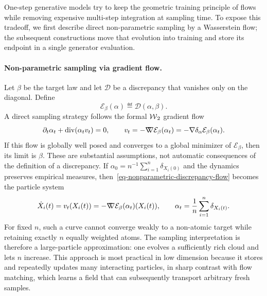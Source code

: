 One-step generative models try to keep the geometric training principle of flows while removing expensive multi-step integration at sampling time. To expose this tradeoff, we first describe direct non-parametric sampling by a Wasserstein flow; the subsequent constructions move that evolution into training and store its endpoint in a single generator evaluation.

\paragraph{Non-parametric sampling via gradient flow.}
Let $\beta$ be the target law and let $\mathcal D$ be a discrepancy that vanishes only on the diagonal. Define
\begin{equation}\label{eq-one-step-discrepancy-energy}
	\mathcal E_\beta(\alpha)\eqdef\mathcal D(\alpha,\beta).
\end{equation}
A direct sampling strategy follows the formal $\operatorname{\mathcal{W}}_2$ gradient flow
\begin{equation}\label{eq-nonparametric-discrepancy-flow}
	\partial_t\alpha_t+\operatorname{div}(\alpha_t v_t)=0,
	\qquad
	v_t=-\mathord{\nabla\mkern-9.3mu\nabla}\mathcal E_\beta(\alpha_t)
	=-\nabla\delta_\alpha\mathcal E_\beta(\alpha_t).
\end{equation}
If this flow is globally well posed and converges to a global minimizer of $\mathcal E_\beta$, then its limit is $\beta$. These are substantial assumptions, not automatic consequences of the definition of a discrepancy. If $\alpha_0=n^{-1}\sum_{i=1}^n\delta_{X_i(0)}$ and the dynamics preserves empirical measures, then~\eqref{eq-nonparametric-discrepancy-flow} becomes the particle system
\begin{equation}\label{eq-nonparametric-particle-flow}
	\dot X_i(t)=v_t(X_i(t))
	=-\mathord{\nabla\mkern-9.3mu\nabla}\mathcal E_\beta(\alpha_t)(X_i(t)),
	\qquad
	\alpha_t=\frac1n\sum_{i=1}^n\delta_{X_i(t)}.
\end{equation}
For fixed $n$, such a curve cannot converge weakly to a non-atomic target while retaining exactly $n$ equally weighted atoms. The sampling interpretation is therefore a large-particle approximation: one evolves a sufficiently rich cloud and lets $n$ increase. This approach is most practical in low dimension because it stores and repeatedly updates many interacting particles, in sharp contrast with flow matching, which learns a field that can subsequently transport arbitrary fresh samples.

